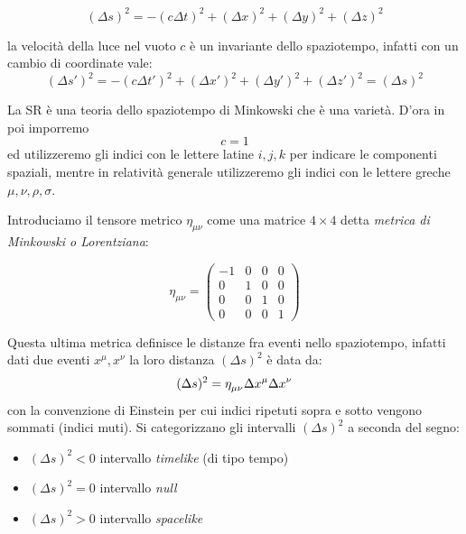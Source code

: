 \documentclass[twoside]{article}
\begin{document}
\begin{equation}
(\Delta s)^2 = -(c\Delta t)^2 + (\Delta x)^2 + (\Delta y)^2 +(\Delta z)^2 
\end{equation}

la velocità della luce nel vuoto $c$ è un invariante dello spaziotempo, infatti con un cambio di coordinate vale:
\begin{equation}
(\Delta s')^2 = -(c\Delta t')^2 + (\Delta x')^2 + (\Delta y')^2 +(\Delta z')^2 = (\Delta s)^2
\end{equation}

La SR è una teoria dello spaziotempo di Minkowski che è una varietà. D'ora in poi imporremo 
\begin{equation*}
	\boxed{c = 1}
\end{equation*}
ed utilizzeremo gli indici con le lettere latine $i,j,k$ per indicare le componenti spaziali, mentre in relatività generale utilizzeremo gli indici con le lettere greche $\mu, \nu, \rho, \sigma$.

Introduciamo il tensore metrico $\eta_{\mu \nu}$ come una matrice $4\times 4$ detta \emph{metrica di Minkowski o Lorentziana}:

\begin{equation}\label{eq:lorentzianmetric}
\eta_{\mu \nu} =  \begin{pmatrix} -1 &0 &0 &0 \\ 0& 1& 0& 0  \\ 0&0&1&0 \\ 0&0&0&1 \end{pmatrix}
\end{equation}

Questa ultima metrica definisce le distanze fra eventi nello spaziotempo, infatti dati due eventi $x^\mu,x^\nu$ la loro distanza $(\Delta s)^2$ è data da:
\begin{equation}
(\Delta s)^2 =  \eta\indices{_\mu_\nu}\Delta x^{\mu} \Delta x^{\nu}
\end{equation}
con la convenzione di Einstein per cui indici ripetuti sopra e sotto vengono sommati (indici muti).
Si categorizzano gli intervalli $(\Delta s)^2$ a seconda del segno:
\begin{itemize}
	\item $(\Delta s)^2<0$ intervallo \emph{timelike} (di tipo tempo)
	\item $(\Delta s)^2=0$ intervallo \emph{null}
	\item $(\Delta s)^2>0$ intervallo \emph{spacelike}
\end{itemize}
\end{document}
